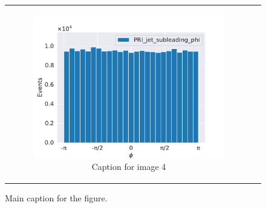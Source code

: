 \documentclass[../../main/main.tex]{subfiles}
\begin{document}
\begin{figure}
\begin{tabular}{cc}
\begin{subfigure}[b]{0.50\textwidth}
            \centering
            \includegraphics[width=\textwidth]{../../plots/PRI_jet_subleading_phi.pdf}
            \caption{Caption for image 4}
            \label{fig:sub4}
        \end{subfigure}
    \end{tabular}
    \caption{Main caption for the figure.}
    \label{fig:main}
\end{figure}
\end{document}
